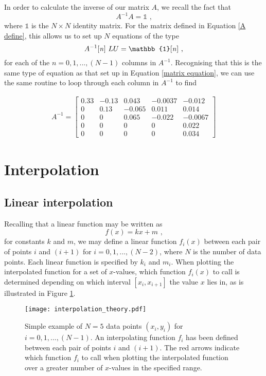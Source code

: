 \documentclass[paper=a4, fontsize=11pt]{scrartcl}
\begin{document}
In order to calculate the inverse of our matrix $A$, we recall the fact that
\begin{equation}
A^{-1} A = \mathbb{1} \text{ ,}
\end{equation}
where $\mathbb{1}$ is the $N \times N$ identity matrix. For the matrix defined in Equation \ref{A define}, this allows us to set up $N$ equations of the type
\begin{equation}
A^{-1}\text{[\textit{n}] } LU = \mathbb{1}\text{[\textit{n}]} \text{ ,}
\end{equation}
for each of the $n = 0, 1, ... , (N-1)$ columns in $A^{-1}$. Recognising that this is the same type of equation as that set up in Equation \ref{matrix equation}, we can use the same routine to loop through each column in $A^{-1}$ to find 

\begin{align}
\label{A inverse}
A^{-1} = 
\begin{bmatrix}
0.33 & -0.13 & 0.043 & -0.0037 & -0.012 \\
0 & 0.13 & -0.065 & 0.011 & 0.014 \\
0 & 0 & 0.065 & -0.022 & -0.0067 \\
0 & 0 & 0 & 0 & 0.022 \\
0 & 0 & 0 & 0 & 0.034
\end{bmatrix}
\end{align}

\section{Interpolation}
\subsection{Linear interpolation}
Recalling that a linear function may be written as 
\begin{equation}
f(x) = kx + m \text{ ,}
\end{equation}
for constants $k$ and $m$, we may define a linear function $f_{i}(x)$ between each pair of points $i$ and $(i+1)$ for $i = 0, 1, ... , (N-2)$, where $N$ is the number of data points. Each linear function is specified by $k_{i}$ and $m_{i}$. When plotting the interpolated function for a set of $x$-values, which function $f_{i}(x)$ to call is determined depending on which interval $[x_{i}, x_{i+1}]$ the value $x$ lies in, as is illustrated in Figure \ref{interpolation theory}. 
\begin{figure}
	\centering
	\texttt{[image: interpolation\_theory.pdf]}
	\caption{\footnotesize{Simple example of $N=5$ data points $(x_{i}, y_{i})$ for $i = 0, 1, ... , (N-1)$. An interpolating function $f_{i}$ has been defined between each pair of points $i$ and $(i+1)$. The red arrows indicate which function $f_{i}$ to call when plotting the interpolated function over a greater number of $x$-values in the specified range.}}
	\label{interpolation theory}
\end{figure}
\end{document}

